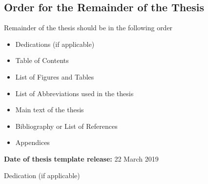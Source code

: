



\begin{instructional}
\section*{Order for the Remainder of the Thesis}
\noindent
    Remainder of the thesis should be in the following order

    \begin{itemize}
        \item Dedications (if applicable)
        \item Table of Contents
        \item List of Figures and Tables
        \item List of Abbreviations used in the thesis
        \item Main text of the thesis
        \item Bibliography or List of References
        \item Appendices
    \end{itemize}

\noindent
\textbf{Date of thesis template release:} 22 March 2019
\end{instructional}
\clearpage


	\rmfamily
	\normalfont
    
    	\begin{vplace}[1]
		\begin{center}
        Dedication (if applicable)
		\end{center}
	\end{vplace}


\clearpage
\pagestyle{headings}


\tableofcontents
	\clearpage
\listoffigures
	\clearpage
\listoftables
\newpage

